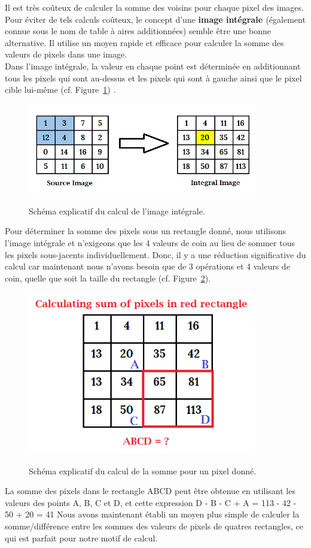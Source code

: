 \documentclass[12pt]{article}
\begin{document}
\begin{enumerate}
Il est très coûteux de calculer la somme des voisins pour chaque pixel des images. Pour éviter de tels calculs coûteux, le concept d'une \textbf{image intégrale \cite{image integrale}} (également connue sous le nom de table à aires additionnées) semble être une bonne alternative. Il utilise un moyen rapide et efficace pour calculer la somme des valeurs de pixels dans une image.\\
Dans l'image intégrale, la valeur en chaque point est déterminée en additionnant tous les pixels qui sont au-dessus et les pixels qui sont à gauche ainsi que le pixel cible lui-même (cf. Figure~\ref{fig:image_integrale}) .\\


\begin{figure}[H]
    \centering
     {{\includegraphics[width=10cm]{integral-image.png} }}
    \caption{Schéma explicatif du calcul de l'image intégrale.}
    \label{fig:image_integrale}
\end{figure}


Pour déterminer la somme des pixels sous un rectangle donné, nous utilisons l'image intégrale et n'exigeons que les 4 valeurs de coin au lieu de sommer tous les pixels sous-jacents individuellement. Donc, il y a une réduction significative du calcul car maintenant nous n'avons besoin que de 3 opérations et 4 valeurs de coin, quelle que soit la taille du rectangle (cf. Figure~\ref{fig:calcul_somme}).
\begin{figure}[H]
    \centering
     {{\includegraphics[width=10cm]{integral2.png} }}
     \caption{Schéma explicatif du calcul de la somme pour un pixel donné.}
    \label{fig:calcul_somme}
\end{figure}
La somme des pixels dans le rectangle ABCD peut être obtenue en utilisant les valeurs des points A, B, C et D, et cette expression D - B - C + A = 113 - 42 - 50 + 20 = 41 
Nous avons maintenant établi un moyen plus simple de calculer la somme/différence entre les sommes des valeurs de pixels de quatres rectangles, ce qui est parfait pour notre motif de calcul.


\end{enumerate}
\end{document}
